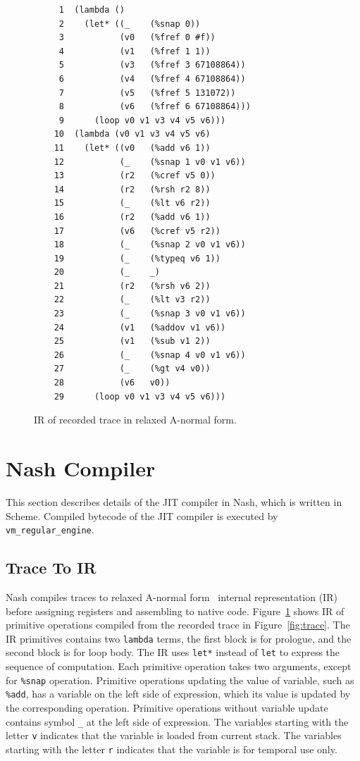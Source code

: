 \documentclass[preprint, 10pt]{sigplanconf}
\begin{document}
\begin{figure}
  \centering
  \small
\begin{verbatim}
     1	(lambda ()
     2    (let* ((_    (%snap 0))
     3           (v0   (%fref 0 #f))
     4           (v1   (%fref 1 1))
     5           (v3   (%fref 3 67108864))
     6           (v4   (%fref 4 67108864))
     7           (v5   (%fref 5 131072))
     8           (v6   (%fref 6 67108864)))
     9      (loop v0 v1 v3 v4 v5 v6)))
    10	(lambda (v0 v1 v3 v4 v5 v6)
    11    (let* ((v0   (%add v6 1))
    12           (_    (%snap 1 v0 v1 v6))
    13           (r2   (%cref v5 0))
    14           (r2   (%rsh r2 8))
    15           (_    (%lt v6 r2))
    16           (r2   (%add v6 1))
    17           (v6   (%cref v5 r2))
    18           (_    (%snap 2 v0 v1 v6))
    19           (_    (%typeq v6 1))
    20           (_    _)
    21           (r2   (%rsh v6 2))
    22           (_    (%lt v3 r2))
    23           (_    (%snap 3 v0 v1 v6))
    24           (v1   (%addov v1 v6))
    25           (v1   (%sub v1 2))
    26           (_    (%snap 4 v0 v1 v6))
    27           (_    (%gt v4 v0))
    28           (v6   v0))
    29      (loop v0 v1 v3 v4 v5 v6)))
\end{verbatim}
\caption{IR of recorded trace in relaxed A-normal form.}
\label{fig:anf}
\end{figure}

\section{Nash Compiler}
\label{sec:compiler}

This section describes details of the JIT compiler in Nash, which is written in
Scheme. Compiled bytecode of the JIT compiler is executed by
\texttt{vm\_regular\_engine}.

\subsection{Trace To IR}
Nash compiles traces to relaxed A-normal form~\cite{flanagan1993essence}
internal representation (IR) before assigning registers and assembling to native
code. Figure~\hyperref[fig:anf]{\ref{fig:anf}} shows IR of primitive operations
compiled from the recorded trace in
Figure~\hyperref[fig:trace]{\ref{fig:trace}}. The IR primitives contains two
\texttt{lambda} terms, the first block is for prologue, and the second block is
for loop body. The IR uses \texttt{let*} instead of \texttt{let} to express the
sequence of computation. Each primitive operation takes two arguments, except
for \texttt{\%snap} operation. Primitive operations updating the value of
variable, such as \texttt{\%add}, has a variable on the left side of expression,
which its value is updated by the corresponding operation. Primitive operations
without variable update contains symbol \texttt{\_} at the left side of
expression. The variables starting with the letter \texttt{v} indicates that the
variable is loaded from current stack. The variables starting with the letter
\texttt{r} indicates that the variable is for temporal use only.
\end{document}
